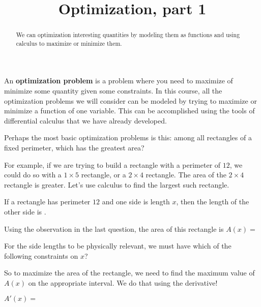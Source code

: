 \documentclass{ximera}
\title{Optimization, part 1}
\begin{document}
\begin{abstract}
  We can optimization interesting quantities by modeling them as functions and using calculus to maximize or minimize them.
\end{abstract}

\maketitle


An \textbf{optimization problem} is a problem where you need to maximize of minimize some quantity given some constraints.  In this course, all the optimization problems we will consider can be modeled by trying to maximize or minimize a function of one variable.  This can be accomplished using the tools of differential calculus that we have already developed.

Perhaps the most basic optimization problems is this:  among all rectangles of a fixed perimeter, which has the greatest area?

For example, if we are trying to build a rectangle with a perimeter of $12$, we could do so with a $1 \times 5$ rectangle, or a $2 \times 4$ rectangle.  The area of the $2 \times 4$ rectangle is greater.  Let's use calculus to find the largest such rectangle.

\begin{question}
	If a rectangle has perimeter $12$ and one side is length $x$, then the length of the other side is .
\end{question}

\begin{question}
	Using the observation in the last question, the area of this rectangle is $A(x) =$
\end{question}

\begin{question}
	For the side lengths to be physically relevant, we must have which of the following constraints on $x$?
	\begin{multipleChoice}
  	\end{multipleChoice}
\end{question}

So to maximize the area of the rectangle, we need to find the maximum value of $A(x)$ on the appropriate interval.  We do that using the derivative!

\begin{question}
	$A'(x) =$ 
\end{question}
\end{document}
